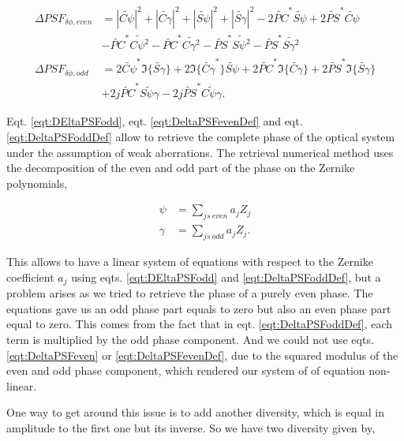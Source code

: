 \begin{align}
\Delta PSF_{\delta\phi, even} &= |\widetilde{C\psi}|^2 + |\widetilde{C\gamma}|^2 +|\widetilde{S\psi}|^2 + |\widetilde{S\gamma}|^2 -2\widetilde{PC}^*\widetilde{S\psi}+2\widetilde{PS}^*\widetilde{C\psi} \nonumber\\
&-\widetilde{PC}^*\widetilde{C\psi^2}-\widetilde{PC}^*\widetilde{C\gamma^2}-\widetilde{PS}^*\widetilde{S\psi^2}-\widetilde{PS}^*\widetilde{S\gamma^2} \label{eqt:DeltaPSFevenDef}\\
\Delta PSF_{\delta\phi, odd} &= 2\widetilde{C\psi}^*\Im\lbrace\widetilde{S\gamma}\rbrace+2\Im\lbrace\widetilde{C\gamma}^*\rbrace\widetilde{S\psi}+2\widetilde{PC}^*\Im\lbrace\widetilde{C\gamma}\rbrace+2\widetilde{PS}^*\Im\lbrace\widetilde{S\gamma}\rbrace \nonumber\\
&+2j\widetilde{PC}^*\widetilde{S\psi\gamma}-2j\widetilde{PS}^*\widetilde{C\psi\gamma}.\label{eqt:DeltaPSFoddDef}
\end{align}

Eqt. \eqref{eqt:DEltaPSFodd}, eqt. \eqref{eqt:DeltaPSFevenDef} and eqt. \eqref{eqt:DeltaPSFoddDef} allow to retrieve the complete phase of the optical system under the assumption of weak aberrations. The retrieval numerical method uses the decomposition of the even and odd part of the phase on the Zernike polynomials,

\begin{align}
\psi &= \sum\limits_{js\ even} a_j Z_j \label{eqt:evenPhaseDecomp}\\
\gamma &= \sum\limits_{js\ odd} a_j Z_j. \label{eqt:oddPhaseDecomp}
\end{align}

This allows to have a linear system of equations with respect to the Zernike coefficient $a_j$ using eqts. \eqref{eqt:DEltaPSFodd} and \eqref{eqt:DeltaPSFoddDef}, but a problem arises as we tried to retrieve the phase of a purely even phase. The equations gave us an odd phase part equals to zero but also an even phase part equal to zero. This comes from the fact that in eqt. \eqref{eqt:DeltaPSFoddDef}, each term is multiplied by the odd phase component. And we could not use eqts. \eqref{eqt:DeltaPSFeven} or \eqref{eqt:DeltaPSFevenDef}, due to the squared modulus of the even and odd phase component, which rendered our system of of equation non-linear.

One way to get around this issue is to add another diversity, which is equal in amplitude to the first one but its inverse. So we have two diversity given by,

